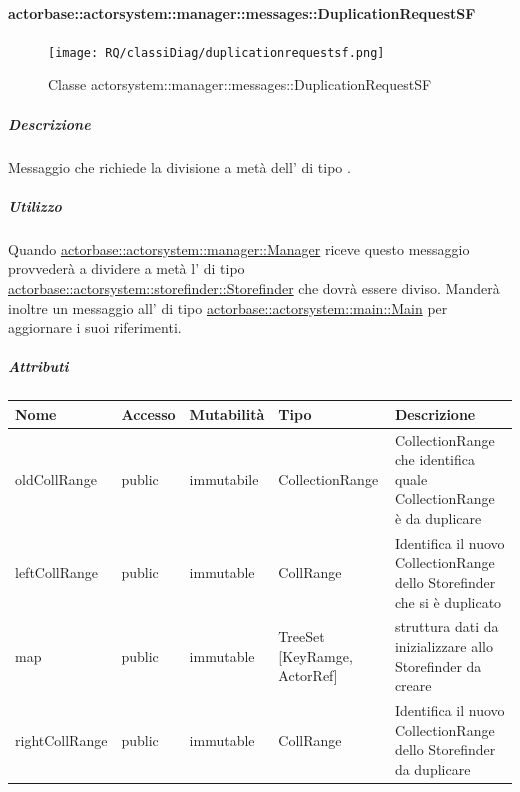 \documentclass{scalatekids-article}
\begin{document}
\paragraph{actorbase::actorsystem::manager::messages::DuplicationRequestSF}
\label{sec:actorbase::actorsystem::manager::messages::DuplicationRequestSF}

\begin{figure}[H]
   \begin{center}
     \texttt{[image: RQ/classiDiag/duplicationrequestsf.png]}
     \caption{Classe actorsystem::manager::messages::DuplicationRequestSF}
   \end{center}
 \end{figure}

\subparagraph{Descrizione}

Messaggio che richiede la divisione a metà dell' di tipo
.

\subparagraph{Utilizzo}

Quando \hyperref[sec:actorbase::actorsystem::manager::Manager]{actorbase::\allowbreak{}actorsystem::\allowbreak{}manager::\allowbreak{}Manager}
riceve questo messaggio provvederà a dividere a metà l' di tipo
\hyperref[sec:actorbase::actorsystem::storefinder::Storefinder]{actorbase::\allowbreak{}actorsystem::\allowbreak{}storefinder::\allowbreak{}Storefinder}
che dovrà essere diviso. Manderà inoltre un messaggio all' di tipo
\hyperref[sec:actorbase::actorsystem::main::Main]{actorbase::\allowbreak{}actorsystem::\allowbreak{}main::\allowbreak{}Main}
per aggiornare i suoi riferimenti.

\subparagraph{Attributi}
\begin{tabular}{| p{3cm} | p{1.5cm} | p{2cm} | p{2cm} | p{8.5cm} |}
  \hline
  Nome & Accesso & Mutabilità & Tipo & Descrizione \\
  \hline
  oldCollRange & public & immutabile & CollectionRange & CollectionRange che identifica quale CollectionRange è da duplicare \\
  \hline
  leftCollRange & public & immutable & CollRange & Identifica il nuovo CollectionRange dello Storefinder che si è duplicato \\
  \hline
  map & public & immutable & TreeSet [KeyRamge, ActorRef] & struttura dati da inizializzare allo Storefinder da creare\\
  \hline
  rightCollRange & public & immutable & CollRange & Identifica il nuovo CollectionRange dello Storefinder da duplicare \\
  \hline
\end{tabular}
\end{document}
